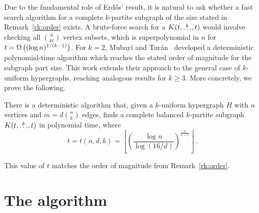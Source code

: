 Due to the fundamental role of Erd\H{o}s' result,
it is natural to ask whether a fast search algorithm for a complete $k$-partite subgraph of the size stated in Remark~\ref{rk:order} exists.
A brute-force search for a $K(t, \overset{k}{\dots}, t)$ would involve checking all $\binom{n}{kt}$ vertex subsets, which is superpolynomial in $n$ for ${t = \Omega\left((\log n)^{1/(k-1)}\right)}$.
For $k=2$, Mubayi and Tur\'{a}n~\cite{MUBAYI2010174} developed a deterministic polynomial-time algorithm which reaches the stated order of magnitude for the subgraph part size.
This work extends their approach to the general case of $k$-uniform hypergraphs, reaching analogous results for $k \ge 3$.
More concretely, we prove the following.

\begin{theorem} \label{thm:main_theorem}
There is a deterministic algorithm that, given a $k$-uniform hypergraph $H$ with $n$ vertices and $m=d \binom{n}{k}$ edges, finds a complete balanced $k$-partite subgraph $K(t, \overset{k}{\dots}, t)$ in polynomial time, where
\[
    t = t(n, d, k) = \left\lfloor \left( \frac{\log n}{\log (16/d)}  \right)^{\frac{1}{k-1}} \right \rfloor \,.
\]
\end{theorem}
This value of $t$ matches the order of magnitude from Remark~\ref{rk:order}.

\section{The algorithm}\label{sec:finding-a-balanced-$k$-partite-subgraph}

